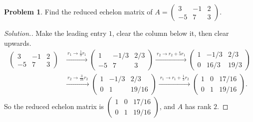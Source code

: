 \documentclass[11pt,a4paper]{article}
\theoremstyle{definition}
\newtheorem{problemx}{Problem}[section]
\newenvironment{problem}{\begin{problemx}}{\end{problemx}}
\newenvironment{solution}
  {\renewcommand{\qedsymbol}{}\begin{proof}[\textit{Solution}.]}
  {\end{proof}}
\begin{document}
\begin{problem}
Find the reduced echelon matrix of
$A=\begin{pmatrix}3&-1&2\\-5&7&3\end{pmatrix}$.
\end{problem}
\begin{solution}
Make the leading entry $1$, clear the column below it, then clear upwards.
\begin{align*}
\begin{pmatrix}3&-1&2\\-5&7&3\end{pmatrix}
&\xrightarrow{\ r_1\rightarrow \frac{1}{3}r_1\ }
\begin{pmatrix}1&-1/3&2/3\\-5&7&3\end{pmatrix}
\xrightarrow{\ r_2\rightarrow r_2+5r_1\ }
\begin{pmatrix}1&-1/3&2/3\\0&16/3&19/3\end{pmatrix}\\[2mm]
&\xrightarrow{\ r_2\rightarrow \frac{3}{16}r_2\ }
\begin{pmatrix}1&-1/3&2/3\\0&1&19/16\end{pmatrix}
\xrightarrow{\ r_1\rightarrow r_1+\frac{1}{3}r_2\ }
\begin{pmatrix}1&0&17/16\\0&1&19/16\end{pmatrix}.
\end{align*}
So the reduced echelon matrix is
$\begin{pmatrix}1&0&17/16\\0&1&19/16\end{pmatrix}$, and $A$ has rank $2$.
\end{solution}
\end{document}
